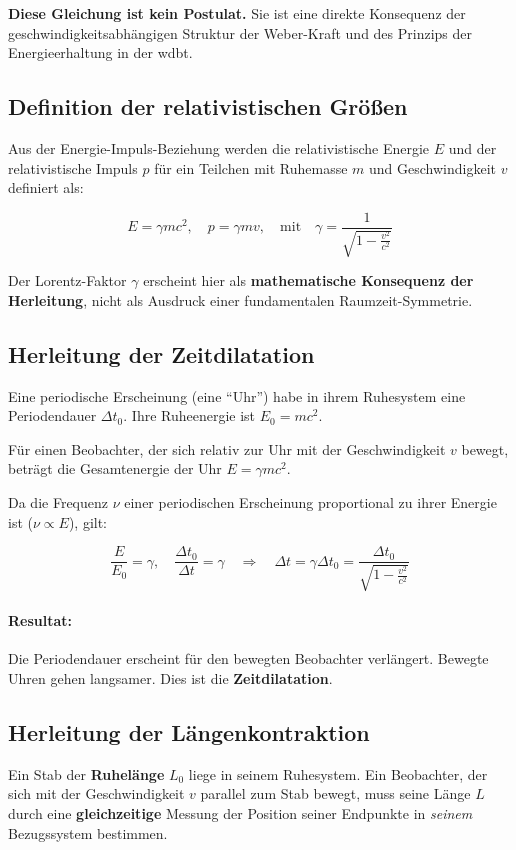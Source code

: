\textbf{Diese Gleichung ist kein Postulat.} Sie ist eine direkte Konsequenz der geschwindigkeitsabhängigen Struktur der Weber-Kraft und des Prinzips der Energieerhaltung in der \gls{wdbt}.

\subsection{Definition der relativistischen Größen}
Aus der Energie-Impuls-Beziehung werden die relativistische Energie $E$ und der relativistische Impuls $p$ für ein Teilchen mit Ruhemasse $m$ und Geschwindigkeit $v$ definiert als:

\begin{equation}
    \label{eq:relativistische_energie}
    E = \gamma m c^2, \quad p = \gamma m v, \quad \text{mit} \quad \gamma = \frac{1}{\sqrt{1 - \frac{v^2}{c^2}}}
\end{equation}

Der Lorentz-Faktor $\gamma$ erscheint hier als \textbf{mathematische Konsequenz der Herleitung}, nicht als Ausdruck einer fundamentalen Raumzeit-Symmetrie.

\subsection{Herleitung der Zeitdilatation}
Eine periodische Erscheinung (eine \enquote{Uhr}) habe in ihrem Ruhesystem eine Periodendauer $\Delta t_0$. Ihre Ruheenergie ist $E_0 = mc^2$.

Für einen Beobachter, der sich relativ zur Uhr mit der Geschwindigkeit $v$ bewegt, beträgt die Gesamtenergie der Uhr $E = \gamma mc^2$.

Da die Frequenz $\nu$ einer periodischen Erscheinung proportional zu ihrer Energie ist ($\nu \propto E$), gilt:

\begin{equation}
    \label{eq:zeitdilatation}
    \frac{E}{E_0} = \gamma, \quad \frac{\Delta t_0}{\Delta t} = \gamma \quad \Rightarrow \quad \Delta t = \gamma \Delta t_0 = \frac{\Delta t_0}{\sqrt{1 - \frac{v^2}{c^2}}}
\end{equation}

\paragraph{Resultat:} Die Periodendauer erscheint für den bewegten Beobachter verlängert. Bewegte Uhren gehen langsamer. Dies ist die \textbf{Zeitdilatation}.

\subsection{Herleitung der Längenkontraktion}
Ein Stab der \textbf{Ruhelänge} $L_0$ liege in seinem Ruhesystem. Ein Beobachter, der sich mit der Geschwindigkeit $v$ parallel zum Stab bewegt, muss seine Länge $L$ durch eine \textbf{gleichzeitige}
Messung der Position seiner Endpunkte in \textit{seinem} Bezugssystem bestimmen.


